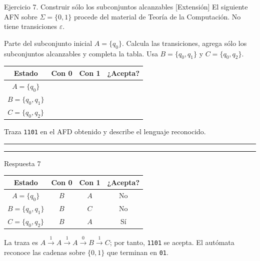 \documentclass[11pt,spanish]{article}
\newcommand{\blank}[1][4cm]{\rule{#1}{0.4pt}}
\newcommand{\espaciosalida}{0.10cm}
\newcommand{\espaciosalida}{0.60cm}
\begin{document}
\begin{ejercicio}{Ejercicio 7. Construir sólo los subconjuntos alcanzables \hfill {\small [Extensión]}}
El siguiente AFN sobre \(\Sigma=\{0,1\}\) procede del material de Teoría de la Computación. No tiene transiciones \(\varepsilon\).

\begin{center}
\end{center}

Parte del subconjunto inicial \(A=\{q_0\}\). Calcula las transiciones, agrega sólo los subconjuntos alcanzables y completa la tabla. Usa \(B=\{q_0,q_1\}\) y \(C=\{q_0,q_2\}\).

\begin{center}
\small
\renewcommand{\arraystretch}{1.3}
\begin{tabular}{|c|c|c|c|}
\hline
\textbf{Estado} & \textbf{Con 0} & \textbf{Con 1} & \textbf{¿Acepta?} \tabularnewline
\hline
\(A=\{q_0\}\) & & & \tabularnewline[\espaciosalida]
\hline
\(B=\{q_0,q_1\}\) & & & \tabularnewline[\espaciosalida]
\hline
\(C=\{q_0,q_2\}\) & & & \tabularnewline[\espaciosalida]
\hline
\end{tabular}
\end{center}

Traza \texttt{1101} en el AFD obtenido y describe el lenguaje reconocido.

\ifrespuestas\else
\blank[14cm]

\blank[14cm]
\fi
\end{ejercicio}

\ifrespuestas
\begin{respuesta}{Respuesta 7}
\begin{center}
\small
\begin{tabular}{|c|c|c|c|}
\hline
\textbf{Estado} & \textbf{Con 0} & \textbf{Con 1} & \textbf{¿Acepta?} \tabularnewline
\hline
\(A=\{q_0\}\) & \(B\) & \(A\) & No \tabularnewline
\hline
\(B=\{q_0,q_1\}\) & \(B\) & \(C\) & No \tabularnewline
\hline
\(C=\{q_0,q_2\}\) & \(B\) & \(A\) & Sí \tabularnewline
\hline
\end{tabular}
\end{center}

La traza es \(A\xrightarrow{1}A\xrightarrow{1}A\xrightarrow{0}B\xrightarrow{1}C\); por tanto, \texttt{1101} se acepta. El autómata reconoce las cadenas sobre \(\{0,1\}\) que terminan en \texttt{01}.
\end{respuesta}
\fi
\end{document}
